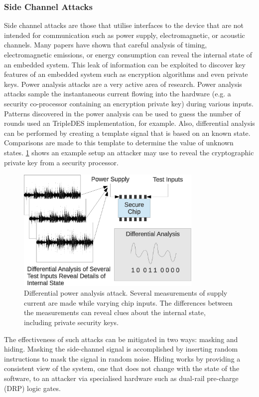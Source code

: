 \documentclass[final,conference,11pt]{IEEEtran}
\begin{document}
\subsubsection{Side Channel Attacks}
Side channel attacks are those that utilise interfaces to the device that are not intended for communication such as power supply, electromagnetic, or acoustic channels.  Many papers have shown that careful analysis of timing, electromagnetic emissions, or energy consumption can reveal the internal state of an embedded system. \cite{Chen2013} This leak of information can be exploited to discover key features of an embedded system such as encryption algorithms and even private keys.  Power analysis attacks are a very active area of research.  Power analysis attacks sample the instantaneous current flowing into the hardware (e.g. a security co-processor containing an encryption private key) during various inputs.  Patterns discovered in the power analysis can be used to guess the number of rounds used an TripleDES implementation, for example.  Also, differential analysis can be performed by creating a template signal that is based on an known state.  Comparisons are made to this template to determine the value of unknown states.  \figurename \ref{fig:side_chan} shows an example setup an attacker may use to reveal the cryptographic private key from a security processor.  \cite{Ambrose2012} 

\begin{figure}[!t]
\centering
\includegraphics[width=3.5in]{diffpower}
\caption{Differential power analysis attack.  Several measurements of supply current are made while varying chip inputs.  The differences between the measurements can reveal clues about the internal state, including private security keys. }
\label{fig:side_chan}
\end{figure}

The effectiveness of such attacks can be mitigated in two ways: masking and hiding.  Masking the side-channel signal is accomplished by inserting random instructions to mask the signal in random noise.  Hiding works by providing a consistent view of the system, one that does not change with the state of the software, to an attacker via specialised hardware such as dual-rail pre-charge (DRP) logic gates.\cite{Rogers2009}
\end{document}
